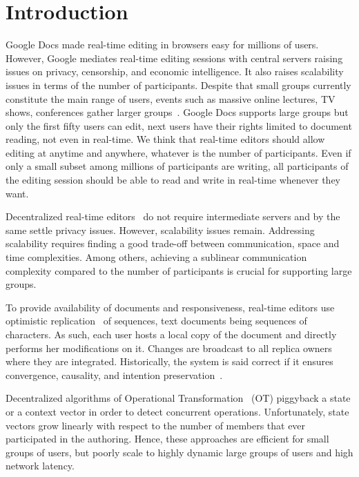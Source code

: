 

\section{Introduction}

Google Docs made real-time editing in browsers easy for millions of
users. However, Google mediates real-time editing sessions with central servers
raising issues on privacy, censorship, and economic intelligence. It also raises
scalability issues in terms of the number of participants.  Despite that small
groups currently constitute the main range of users, events such as massive
online lectures, TV shows, conferences gather larger
groups~\cite{breslow2013studying}.  Google Docs supports large groups but only
the first fifty users can edit, next users have their rights limited to document
reading, not even in real-time.  We think that real-time editors should allow
editing at anytime and anywhere, whatever is the number of participants. Even if
only a small subset among millions of participants are writing, all participants
of the editing session should be able to read and write in real-time whenever
they want.

Decentralized real-time editors~\cite{oster2006data, sun1998operational,
  sun2009contextbased} do not require intermediate servers and by the same
settle privacy issues. However, scalability issues remain.  Addressing
scalability requires finding a good trade-off between communication, space and
time complexities. Among others, achieving a sublinear communication complexity
compared to the number of participants is crucial for supporting large groups.

To provide availability of documents and responsiveness, real-time editors use
optimistic replication~\cite{saito2005optimistic} of sequences, text documents
being sequences of characters. As such, each user hosts a local copy of the
document and directly performs her modifications on it. Changes are broadcast to
all replica owners where they are integrated. Historically, the system is said
correct if it ensures convergence, causality, and intention
preservation~\cite{sun1998achieving}.

Decentralized algorithms of Operational
Transformation~\cite{sun2009contextbased} (OT) piggyback a state or a context
vector in order to detect concurrent operations. Unfortunately, state vectors
grow linearly with respect to the number of members that ever participated in
the authoring. Hence, these approaches are efficient for small groups of users,
but poorly scale to highly dynamic large groups of users and high network
latency.

